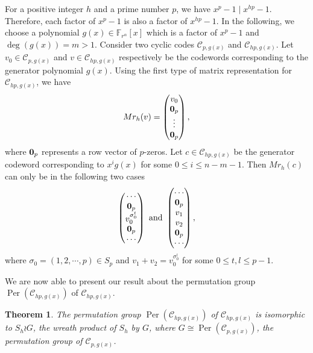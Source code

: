 \documentclass[journal,12pt,onecolumn]{IEEEtran}
\newtheorem{theorem}{Theorem}
\begin{document}
For a positive integer $h$ and a prime number $p$, we have $x^p-1\mid x^{hp}-1$. Therefore, each factor of $x^p-1$ is also a factor of $x^{hp}-1$. In the following, we choose a polynomial $g(x)\in\mathbb{F}_{r^\alpha}[x]$ which is a factor of $x^p-1$ and $\deg (g(x)) = m>1$. Consider two cyclic codes $\mathcal{C}_{p,g(x)}$ and $\mathcal{C}_{hp,g(x)}$. Let $v_0\in\mathcal{C}_{p,g(x)}$ and $v\in\mathcal{C}_{hp,g(x)}$ respectively be the codewords corresponding to the generator polynomial $g(x)$. Using the first type of matrix representation for $\mathcal{C}_{hp,g(x)}$, we have
\[
    Mr_{h}(v) = \begin{pmatrix}
        v_0 \\
        {\bf 0}_p \\
        \vdots \\
        {\bf 0}_p
    \end{pmatrix},
\]
where ${\bf 0}_p$ represents a row vector of $p$-zeros. Let $c\in\mathcal{C}_{hp,g(x)}$ be the generator codeword corresponding to $x^ig(x)$ for some $0\le i\le n-m-1$. Then $Mr_{h}(c)$ can only be in the following two cases
\[
    \begin{pmatrix}
        \cdots \\
        {\bf 0}_p \\
        v_0^{\sigma_0^t} \\
        {\bf 0}_p \\
        \cdots
    \end{pmatrix}\text{ and }\begin{pmatrix}
        \cdots \\
        {\bf 0}_p \\
        v_1 \\
        v_2 \\
        {\bf 0}_p \\
        \cdots
    \end{pmatrix},
\]
where $\sigma_0 = (1,2,\cdots,p)\in S_p$ and $v_1+v_2 = v_0^{\sigma_0^l}$ for some $0\le t,l\le p-1$. 

We are now able to present our result about the permutation group $\operatorname{Per}(\mathcal{C}_{hp,g(x)})$ of $\mathcal{C}_{hp,g(x)}$. 

 
\begin{theorem}\label{L_hp}
    The permutation group $\operatorname{Per}(\mathcal{C}_{hp,g(x)})$ of $\mathcal{C}_{hp,g(x)}$ is isomorphic to $S_h \wr G$, the wreath product of \(S_h\) by \(G\), where $G\cong \operatorname{Per}(\mathcal{C}_{p,g(x)})$, the permutation group of $\mathcal{C}_{p,g(x)}$. 
\end{theorem}
 
\end{document}
